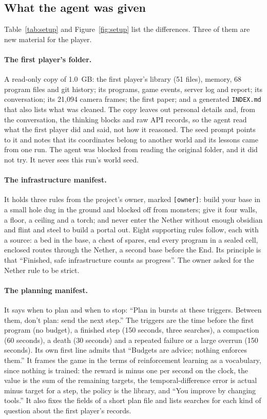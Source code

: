 \documentclass[11pt,a4paper]{article}
\begin{document}
\subsection{What the agent was given}

Table~\ref{tab:setup} and Figure~\ref{fig:setup} list the differences. Three of them are new material for the player.

\paragraph{The first player's folder.} A read-only copy of 1.0~GB: the first player's library (51 files), memory, 68 program files and git history; its programs, game events, server log and report; its conversation; its 21,094 camera frames; the first paper; and a generated \texttt{INDEX.md} that also lists what was cleaned. The copy leaves out personal details and, from the conversation, the thinking blocks and raw API records, so the agent read what the first player did and said, not how it reasoned. The seed prompt points to it and notes that its coordinates belong to another world and its lessons came from one run. The agent was blocked from reading the original folder, and it did not try. It never sees this run's world seed.

\paragraph{The infrastructure manifest.} It holds three rules from the project's owner, marked \texttt{[owner]}: build your base in a small hole dug in the ground and blocked off from monsters; give it four walls, a floor, a ceiling and a torch; and never enter the Nether without enough obsidian and flint and steel to build a portal out. Eight supporting rules follow, each with a source: a bed in the base, a chest of spares, end every program in a sealed cell, enclosed routes through the Nether, a second base before the End. Its principle is that ``Finished, safe infrastructure counts as progress''. The owner asked for the Nether rule to be strict.

\paragraph{The planning manifest.} It says when to plan and when to stop: ``Plan in bursts at these triggers. Between them, don't plan: send the next step.'' The triggers are the time before the first program (no budget), a finished step (150 seconds, three searches), a compaction (60 seconds), a death (30 seconds) and a repeated failure or a large overrun (150 seconds). Its own first line admits that ``Budgets are advice; nothing enforces them.'' It frames the game in the terms of reinforcement learning \citep{sutton2018} as a vocabulary, since nothing is trained: the reward is minus one per second on the clock, the value is the sum of the remaining targets, the temporal-difference error is actual minus target for a step, the policy is the library, and ``You improve by changing tools.'' It also fixes the fields of a short plan file and lists searches for each kind of question about the first player's records.
\end{document}
